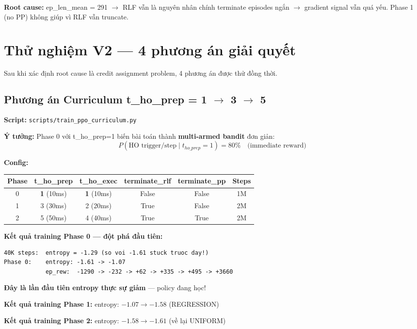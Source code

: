 \documentclass[11pt]{article}
\begin{document}
\textbf{Root cause:} ep\_len\_mean = 291 $\rightarrow$ RLF vẫn là nguyên nhân chính terminate episodes ngắn $\rightarrow$ gradient signal vẫn quá yếu. Phase 1 (no PP) không giúp vì RLF vẫn truncate.

\section{Thử nghiệm V2 --- 4 phương án giải quyết}

Sau khi xác định root cause là credit assignment problem, 4 phương án được thử đồng thời.

\subsection{Phương án Curriculum t\_ho\_prep = 1 $\to$ 3 $\to$ 5}

\textbf{Script:} \texttt{scripts/train\_ppo\_curriculum.py}

\textbf{Ý tưởng:} Phase 0 với t\_ho\_prep=1 biến bài toán thành \textbf{multi-armed bandit} đơn giản:
\[
P(\text{HO trigger/step} \mid t_{ho\_prep}=1) = 80\% \quad \text{(immediate reward)}
\]

\textbf{Config:}

\begin{longtable}{@{}cccccc@{}}
\toprule
\textbf{Phase} & \textbf{t\_ho\_prep} & \textbf{t\_ho\_exec} & \textbf{terminate\_rlf} & \textbf{terminate\_pp} & \textbf{Steps} \\
\midrule
\endhead
0 & \textbf{1} (10ms) & \textbf{1} (10ms) & False & False & 1M \\
1 & 3 (30ms) & 2 (20ms) & True & False & 2M \\
2 & 5 (50ms) & 4 (40ms) & True & True & 2M \\
\bottomrule
\end{longtable}

\textbf{Kết quả training Phase 0 --- đột phá đầu tiên:}
\begin{lstlisting}
40K steps:  entropy = -1.29 (so voi -1.61 stuck truoc day!)
Phase 0:    entropy: -1.61 -> -1.07
            ep_rew:  -1290 -> -232 -> +62 -> +335 -> +495 -> +3660
\end{lstlisting}

\textbf{Đây là lần đầu tiên entropy thực sự giảm} --- policy đang học!

\textbf{Kết quả training Phase 1:} entropy: $-1.07 \to -1.58$ (REGRESSION)

\textbf{Kết quả training Phase 2:} entropy: $-1.58 \to -1.61$ (về lại UNIFORM)
\end{document}
